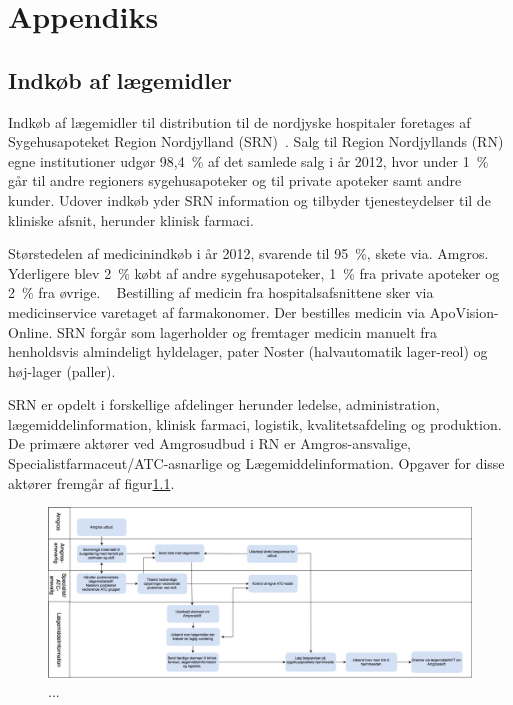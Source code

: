 \chapter{Appendiks} \label{cha:AppC} 
\section{Indkøb af lægemidler}
Indkøb af lægemidler til distribution til de nordjyske hospitaler foretages af Sygehusapoteket Region Nordjylland (SRN)~\citep{SygehusapoteketRegionNordjylland2013}. Salg til Region Nordjyllands (RN) egne institutioner udgør 98,4~\% af det samlede salg i år 2012, hvor under 1~\% går til andre regioners sygehusapoteker og til private apoteker samt andre kunder. Udover indkøb yder SRN information og tilbyder tjenesteydelser til de kliniske afsnit, herunder klinisk farmaci.~\citep{SygehusapoteketRegionNordjylland2013}

Størstedelen af medicinindkøb i år 2012, svarende til 95~\%, skete via. Amgros. Yderligere blev 2~\% købt af andre sygehusapoteker, 1~\% fra private apoteker og 2~\% fra øvrige. ~\citep{SygehusapoteketRegionNordjylland2013}
Bestilling af medicin fra hospitalsafsnittene sker via medicinservice varetaget af farmakonomer. Der bestilles medicin via ApoVision-Online. SRN forgår som lagerholder og fremtager medicin manuelt fra henholdsvis almindeligt hyldelager, pater Noster (halvautomatik lager-reol) og høj-lager (paller).~\citep{SygehusapoteketRegionNordjylland2013}

SRN er opdelt i forskellige afdelinger herunder ledelse, administration, lægemiddelinformation, klinisk farmaci, logistik, kvalitetsafdeling og produktion. De primære aktører ved Amgrosudbud i RN er Amgros-ansvalige, Specialistfarmaceut/ATC-asnarlige og Lægemiddelinformation. Opgaver for disse aktører fremgår af figur\ref{fig:SRNudbud}.

\begin{figure}[H]\centering
	\includegraphics[width=1\textwidth]{billeder/SRNudbud.png} 
	\caption{...}
	\label{fig:SRNudbud}  
\end{figure}

